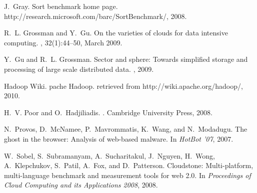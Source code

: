 \documentclass{acm_proc_article-sp}
\begin{document}
\begin{thebibliography}{10}
J.~Gray.
\newblock Sort benchmark home page.
\newblock http://research.microsoft.com/barc/SortBenchmark/, 2008.

R.~L. Grossman and Y.~Gu.
\newblock On the varieties of clouds for data intensive computing.
,
  32(1):44--50, March 2009.

Y.~Gu and R.~L. Grossman.
\newblock Sector and sphere: Towards simplified storage and processing of large
  scale distributed data.
, 2009.

{Hadoop Wiki}.
pache {H}adoop.
\newblock retrieved from http://wiki.apache.org/hadoop/, 2010.

H.~V. Poor and O.~Hadjiliadis.
.
\newblock Cambridge University Press, 2008.

N.~Provos, D.~McNamee, P.~Mavrommatis, K.~Wang, and N.~Modadugu.
\newblock The ghost in the browser: Analysis of web-based malware.
\newblock In {\em HotBot '07}, 2007.

W.~Sobel, S.~Subramanyam, A.~Sucharitakul, J.~Nguyen, H.~Wong, A.~Klepchukov,
  S.~Patil, A.~Fox, and D.~Patterson.
\newblock Cloudstone: Multi-platform, multi-language benchmark and measurement
  tools for web 2.0.
\newblock In {\em Proceedings of Cloud Computing and its Applications 2008},
  2008.

\end{thebibliography}
\end{document}
